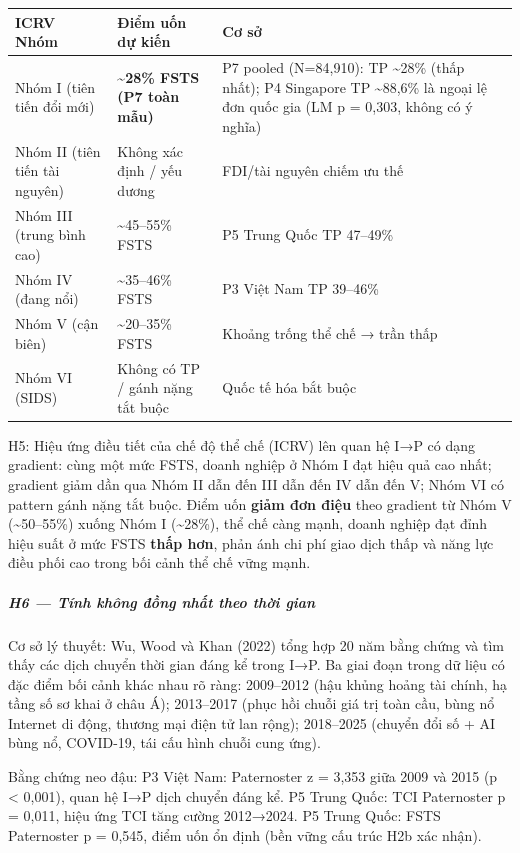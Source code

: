 \documentclass[12pt,a4paper]{article}
\begin{document}
\begin{longtable}[]{@{}lll@{}}
\toprule\noalign{}
ICRV Nhóm & Điểm uốn dự kiến & Cơ sở \\
\midrule\noalign{}
\endhead
\bottomrule\noalign{}
\endlastfoot
Nhóm I (tiên tiến đổi mới) & \textbf{\textasciitilde28\% FSTS (P7 toàn
mẫu)} & P7 pooled (N=84,910): TP \textasciitilde28\% (thấp nhất); P4
Singapore TP \textasciitilde88,6\% là ngoại lệ đơn quốc gia (LM p =
0,303, không có ý nghĩa) \\
Nhóm II (tiên tiến tài nguyên) & Không xác định / yếu dương & FDI/tài
nguyên chiếm ưu thế \\
Nhóm III (trung bình cao) & \textasciitilde45--55\% FSTS & P5 Trung Quốc
TP 47--49\% \\
Nhóm IV (đang nổi) & \textasciitilde35--46\% FSTS & P3 Việt Nam TP
39--46\% \\
Nhóm V (cận biên) & \textasciitilde20--35\% FSTS & Khoảng trống thể chế
→ trần thấp \\
Nhóm VI (SIDS) & Không có TP / gánh nặng tắt buộc & Quốc tế hóa bắt
buộc \\
\end{longtable}

H5: Hiệu ứng điều tiết của chế độ thể chế (ICRV) lên quan hệ I→P có dạng
gradient: cùng một mức FSTS, doanh nghiệp ở Nhóm I đạt hiệu quả cao
nhất; gradient giảm dần qua Nhóm II dẫn đến III dẫn đến IV dẫn đến V;
Nhóm VI có pattern gánh nặng tắt buộc. Điểm uốn \textbf{giảm đơn điệu}
theo gradient từ Nhóm V (\textasciitilde50--55\%) xuống Nhóm I
(\textasciitilde28\%), thể chế càng mạnh, doanh nghiệp đạt đỉnh hiệu
suất ở mức FSTS \textbf{thấp hơn}, phản ánh chi phí giao dịch thấp và
năng lực điều phối cao trong bối cảnh thể chế vững mạnh.

\hypertarget{h6--tuxednh-khuxf4ng-ux111ux1ed3ng-nhux1ea5t-theo-thux1eddi-gian}{%
\subparagraph{H6 --- Tính không đồng nhất theo thời
gian}\label{h6--tuxednh-khuxf4ng-ux111ux1ed3ng-nhux1ea5t-theo-thux1eddi-gian}}

Cơ sở lý thuyết: Wu, Wood và Khan (2022) tổng hợp 20 năm bằng chứng và
tìm thấy các dịch chuyển thời gian đáng kể trong I→P. Ba giai đoạn trong
dữ liệu có đặc điểm bối cảnh khác nhau rõ ràng: 2009--2012 (hậu khủng
hoảng tài chính, hạ tầng số sơ khai ở châu Á); 2013--2017 (phục hồi
chuỗi giá trị toàn cầu, bùng nổ Internet di động, thương mại điện tử lan
rộng); 2018--2025 (chuyển đổi số + AI bùng nổ, COVID-19, tái cấu hình
chuỗi cung ứng).

Bằng chứng neo đậu: P3 Việt Nam: Paternoster z = 3,353 giữa 2009 và 2015
(p \textless{} 0,001), quan hệ I→P dịch chuyển đáng kể. P5 Trung Quốc:
TCI Paternoster p = 0,011, hiệu ứng TCI tăng cường 2012→2024. P5 Trung
Quốc: FSTS Paternoster p = 0,545, điểm uốn ổn định (bền vững cấu trúc
H2b xác nhận).
\end{document}
